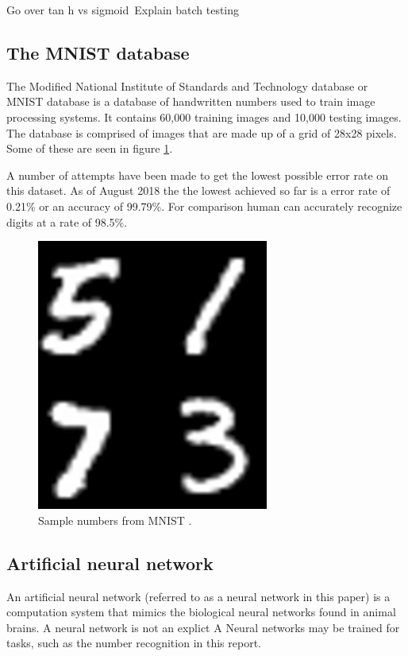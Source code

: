 \documentclass[12pt]{article}
\begin{document}
	Go over tan h vs sigmoid\
	Explain batch testing
	

	\subsection{The MNIST database}
	The Modified National Institute of Standards and Technology database or MNIST database\cite{mnistDATABASE} is a database of handwritten numbers used to train image processing systems. It contains 60,000 training images and 10,000 testing images. The database is comprised of images that are made up of a grid of 28x28 pixels. Some of these are seen in figure \ref{fig:mathworksmnistneuralnetfinal}. \par 
	
	A number of attempts have been made to get the lowest possible error rate on this dataset. As of August 2018 the  the lowest achieved so far is a error rate of 0.21\% or an accuracy of 99.79\%. For comparison human can accurately recognize digits at a rate of 98.5\%\cite{humanPerf}. 
	
	\begin{figure}[H]
		\centering
		\includegraphics[width=0.25\linewidth]{mathworks_mnist_neuralnetFinal_v2}
		\caption{Sample numbers from MNIST \cite{mnistMATLAB2}.}
		\label{fig:mathworksmnistneuralnetfinal}
	\end{figure}
	
	\subsection{Artificial neural network}
	An artificial neural network (referred to as a neural network in this paper) is a computation system that mimics the biological neural networks found in animal brains. A neural network is not an explict
	A 
	Neural networks may be trained for tasks, such as the number recognition in this report. 
	
\end{document}
